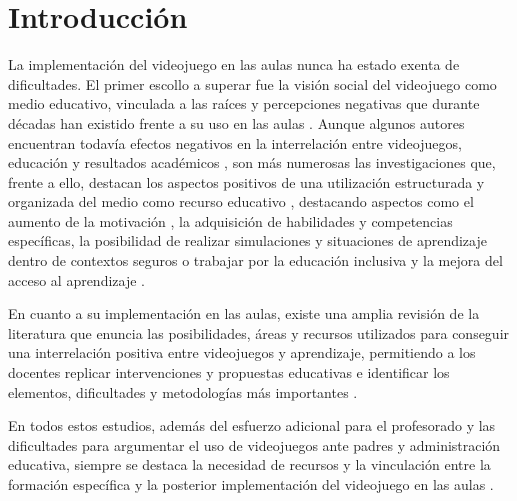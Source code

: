 \documentclass[spanish]{textolivre}
\begin{document}
\section{Introducción}\label{sec-intro}
La implementación del videojuego en las aulas nunca ha estado exenta de dificultades. El primer escollo a superar fue la visión social del videojuego como medio educativo, vinculada a las raíces y percepciones negativas que durante décadas han existido frente a su uso en las aulas \cite{moreno2025violence,nunez2020videojuegos}. Aunque algunos autores encuentran todavía efectos negativos en la interrelación entre videojuegos, educación y resultados académicos \cite{carrillo2022consumo}, son más numerosas las investigaciones que, frente a ello, destacan los aspectos positivos de una utilización estructurada y organizada del medio como recurso educativo \cite{cole2024scoping,granic2014benefits,martinez2022entertainment,mielgo2022revision,rodriguez2002jovenes}, destacando aspectos como el aumento de la motivación \cite{gordillo2022comparing,tacoronte2023systematic}, la adquisición de habilidades y competencias específicas, la posibilidad de realizar simulaciones y situaciones de aprendizaje dentro de contextos seguros \cite{arias2014using,buil2019encouraging,kashiwakura2008jogando} o trabajar por la educación inclusiva y la mejora del acceso al aprendizaje \cite{screpnik2024educacion}.

En cuanto a su implementación en las aulas, existe una amplia revisión de la literatura \cite{boyle2016update,connolly2012systematic,grande2018beneficios,guerra2022investigacion} que enuncia las posibilidades, áreas y recursos utilizados para conseguir una interrelación positiva entre videojuegos y aprendizaje, permitiendo a los docentes replicar  intervenciones y propuestas educativas e identificar los elementos, dificultades y metodologías más importantes \cite{marklund2016educational,tsekleves2016benefits}.

En todos estos estudios, además del esfuerzo adicional para el profesorado y las dificultades para argumentar el uso de videojuegos ante padres y administración educativa, siempre se destaca la necesidad de recursos y la vinculación entre la formación específica \cite{gonzalez2023diseno} y la posterior implementación del videojuego en las aulas \cite{correa2016horizontes,cozar2024ensenar,lorca2016utilidad,marin2022videojuegos}.
\end{document}
